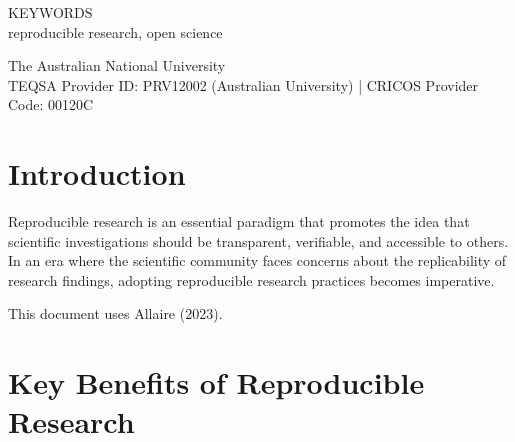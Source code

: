 \documentclass[
  a4paper,
  oneside,
  open=any]{scrbook}
\renewcommand*\contentsname{Table of contents}
\newcommand\contentsname{Table of contents}
\begin{document}
\begin{frontmatter}
\begin{titlepage}
\begin{minipage}[b][\textheight][s]{\textwidth}
\begin{titlepagebox}
  {\textcolor{anugold}{\MakeUppercase{Keywords}}}\\
  reproducible research, open science

  \end{titlepagebox}

  \vspace{2\baselineskip}






  \vfill



  \vspace{1\baselineskip}

  The Australian National University\\{\footnotesize TEQSA Provider ID: PRV12002 (Australian University) | CRICOS Provider Code: 00120C}

  \end{minipage}
  \restoregeometry

  \end{titlepage}
  \end{frontmatter}

\restoregeometry

\cleardoublepage
{}


\renewcommand*\contentsname{Table of contents}
{
\setcounter{tocdepth}{2}
\tableofcontents
}
\mainmatter
\section{Introduction}\label{introduction}

Reproducible research is an essential paradigm that promotes the idea
that scientific investigations should be transparent, verifiable, and
accessible to others. In an era where the scientific community faces
concerns about the replicability of research findings, adopting
reproducible research practices becomes imperative.

This document uses Allaire (2023).

\section{Key Benefits of Reproducible
Research}\label{key-benefits-of-reproducible-research}
\end{document}
